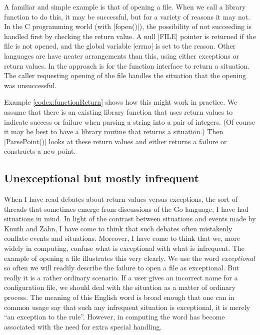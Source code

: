 \documentclass[10pt]{amsart}
\begin{document}
A familiar and simple example is that of opening a file.  When we call
a library function to do this, it may be successful, but for a variety
of reasons it may not.  In the C programming world (with |fopen()|),
the possibility of not succeeding is handled first by checking the
return value.  A null |FILE| pointer is returned if the file is not
opened, and the global variable |errno| is set to the reason.  Other
languages are have neater arrangements than this, using either
exceptions or return values.  In \Utop the approach is for the
function interface to return a situation.  The caller requesting
opening of the file handles the situation that the opening was
unsuccessful.

Example \ref{codex:functionReturn} shows how this might work in
practice.  We assume that there is an existing library function that
uses return values to indicate success or failure when parsing a
string into a pair of integers.  (Of course it may be best to have a
library routine that returns a situation.)  Then |ParsePoint()| looks
at these return values and either returns a failure or constructs a
new point.

\subsection{Unexceptional but mostly infrequent}

When I have read debates about return values versus exceptions, the
sort of threads that sometimes emerge from discussions of the Go
language, I have had situations in mind.  In light of the contrast
between situations and events made by Knuth and Zahn, I have come to
think that such debates often mistakenly conflate events and
situations.  Moreover, I have come to think that we, more widely in
computing, confuse what is exceptional with what is infrequent.  The
example of opening a file illustrates this very clearly.  We use the
word \emph{exceptional} so often we will readily describe the failure
to open a file as exceptional.  But really it is a rather ordinary
scenario.  If a user gives an incorrect name for a configuration file,
we should deal with the situation as a matter of ordinary process.
The meaning of this English word is broad enough that one can in
common usage say that such any infrequent situation is exceptional, it
is merely ``an exception to the rule''.  However, in computing the
word has become associated with the need for extra special handling.
\end{document}

